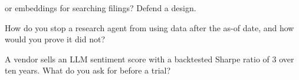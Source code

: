 \begin{interviewq}\label{iq:ml:large-language-models-in-finance:4}
 or embeddings for searching filings? Defend a design.
\end{interviewq}

\begin{interviewq}\label{iq:ml:large-language-models-in-finance:5}
How do you stop a research agent from using data after the as-of date, and how would you prove it did not?
\end{interviewq}

\begin{interviewq}\label{iq:ml:large-language-models-in-finance:6}
A vendor sells an LLM sentiment score with a backtested Sharpe ratio of 3 over ten years. What do you ask for before a trial?
\end{interviewq}
